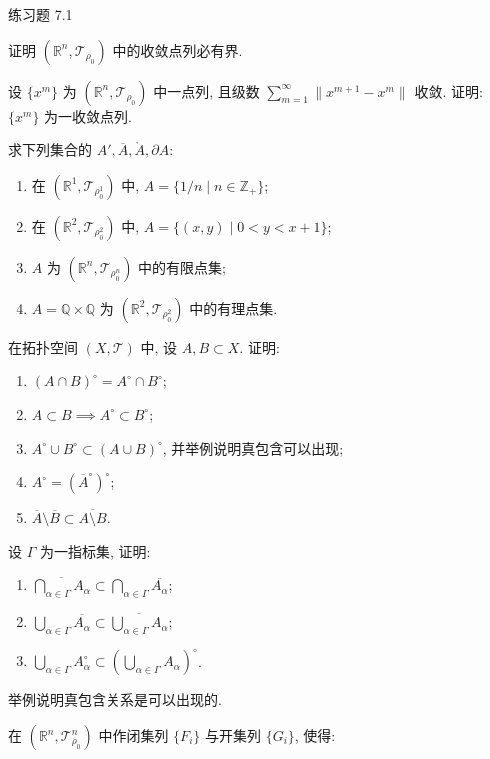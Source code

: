 \begin{exblock}{练习题 7.1}
  \item 证明 $(\mathbb{R}^n, \mathcal{T}_{\rho_0})$ 中的收敛点列必有界.
  \item 设 $\{x^m\}$ 为 $(\mathbb{R}^n, \mathcal{T}_{\rho_0})$ 中一点列, 且级数 $\sum_{m=1}^\infty \|x^{m+1} - x^m\|$ 收敛. 证明: $\{x^m\}$ 为一收敛点列.
  \item 求下列集合的 $A', \overline{A}, \mathring{A}, \partial A$:
  \begin{enumerate}
    \item 在 $(\mathbb{R}^1, \mathcal{T}_{\rho_0^1})$ 中, $A = \{1/n \mid n \in \mathbb{Z}_+\}$;
    \item 在 $(\mathbb{R}^2, \mathcal{T}_{\rho_0^2})$ 中, $A = \{(x, y) \mid 0 < y < x + 1\}$;
    \item $A$ 为 $(\mathbb{R}^n, \mathcal{T}_{\rho_0^n})$ 中的有限点集;
    \item $A = \mathbb{Q} \times \mathbb{Q}$ 为 $(\mathbb{R}^2, \mathcal{T}_{\rho_0^2})$ 中的有理点集.
  \end{enumerate}
  \item 在拓扑空间 $(X, \mathcal{T})$ 中, 设 $A, B \subset X$. 证明:
  \begin{enumerate}
    \item $(A \cap B)^\circ = A^\circ \cap B^\circ$;
    \item $A \subset B \implies A^\circ \subset B^\circ$;
    \item $A^\circ \cup B^\circ \subset (A \cup B)^\circ$, 并举例说明真包含可以出现;
    \item $A^\circ = (\overline{A}^\circ)^\circ$;
    \item $\overline{A} \setminus \overline{B} \subset \overline{A \setminus B}$.
  \end{enumerate}
  \item 设 $\Gamma$ 为一指标集, 证明:
  \begin{enumerate}
    \item $\overline{\bigcap_{\alpha \in \Gamma} A_\alpha} \subset \bigcap_{\alpha \in \Gamma} \overline{A_\alpha}$;
    \item $\bigcup_{\alpha \in \Gamma} \overline{A_\alpha} \subset \overline{\bigcup_{\alpha \in \Gamma} A_\alpha}$;
    \item $\bigcup_{\alpha \in \Gamma} A_\alpha^\circ \subset \left(\bigcup_{\alpha \in \Gamma} A_\alpha\right)^\circ$.
  \end{enumerate}
  举例说明真包含关系是可以出现的.
  \item 在 $(\mathbb{R}^n, \mathcal{T}_{\rho_0}^n)$ 中作闭集列 $\{F_i\}$ 与开集列 $\{G_i\}$, 使得:

\end{exblock}
